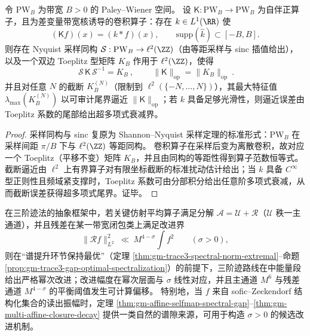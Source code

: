 \begin{theorem}\label{thm:gm-pw-bandlimited-sampling-toeplitz}
令 \(\mathrm{PW}_B\) 为带宽 \(B>0\) 的 Paley--Wiener 空间。
设 \(\mathsf{K}:\mathrm{PW}_B\to \mathrm{PW}_B\) 为自伴正算子，且为差变量带宽核诱导的卷积算子：存在 \(k\in L^1(\RR)\) 使
\[
(\mathsf{K}f)(x)=(k*f)(x),\qquad \mathrm{supp}(\widehat{k})\subset[-B,B].
\]
则存在 Nyquist 采样同构 \(\mathcal{S}:\mathrm{PW}_B\to \ell^2(\ZZ)\)（由等距采样与 sinc 插值给出），以及一个双边 Toeplitz 型矩阵 \(K_B\) 作用于 \(\ell^2(\ZZ)\)，使得
\[
\boxed{\ \mathcal{S}\,\mathsf{K}\,\mathcal{S}^{-1}=K_B\ },
\qquad
\boxed{\ \|\mathsf{K}\|_{\mathrm{op}}=\|K_B\|_{\mathrm{op}}\ }.
\]
并且对任意 \(N\) 的截断 \(K_B^{(N)}\)（限制到 \(\ell^2(\{-N,\dots,N\})\)），其最大特征值 \(\lambda_{\max}(K_B^{(N)})\) 以可审计尾界逼近 \(\|\mathsf{K}\|_{\mathrm{op}}\)；若 \(k\) 具备足够光滑性，则逼近误差由 Toeplitz 系数的尾部给出超多项式衰减界。
\end{theorem}

\begin{proof}
采样同构与 sinc 复原为 Shannon--Nyquist 采样定理的标准形式：\(\mathrm{PW}_B\) 在采样间距 \(\pi/B\) 下与 \(\ell^2(\ZZ)\) 等距同构。
卷积算子在采样后变为离散卷积，故对应一个 Toeplitz（平移不变）矩阵 \(K_B\)，并且由同构的等距性得到算子范数恒等式。
截断逼近由 \(\ell^2\) 上有界算子对有限坐标截断的标准扰动估计给出；当 \(k\) 具备 \(C^\infty\) 型正则性且频域紧支撑时，Toeplitz 系数可由分部积分给出任意阶多项式衰减，从而截断误差获得超多项式尾界。证毕。
\end{proof}

\begin{proposition}\label{prop:gm-affine-gap-improves-trace3}
在三阶迹法的抽象框架中，若关键仿射平均算子满足分解 \(\mathcal{A}=\mathcal{U}+\mathcal{R}\)（\(\mathcal{U}\) 秩一主通道），并且残差在某一带宽闭包类上满足改进界
\[
\|\mathcal{R}f\|_{L^2}^2\ \ll\ M^{4-\sigma}\int f^2
\qquad(\sigma>0),
\]
则在“谱提升环节保持最优”（定理 \ref{thm:gm-trace3-spectral-norm-extremal}--命题 \ref{prop:gm-trace3-gap-optimal-spectralization}）的前提下，三阶迹路线在中能量段给出严格幂次改进；改进幅度在幂次层面与 \(\sigma\) 线性对应，并且主通道 \(M^6\) 与残差通道 \(M^{4-\sigma}\) 的平衡阈值发生可计算偏移。
特别地，当 \(f\) 来自 sofic--Zeckendorf 结构化集合的读出振幅时，定理 \ref{thm:gm-affine-selfmap-spectral-gap}--\ref{thm:gm-multi-affine-closure-decay} 提供一类自然的谱隙来源，可用于构造 \(\sigma>0\) 的候选改进机制。
\end{proposition}

